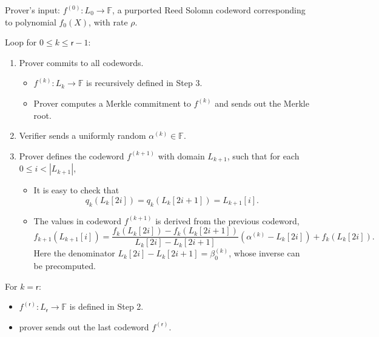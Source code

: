 Prover's input: 
$f^{(0)}: L_{0} \rightarrow \mathbb{F}$, a purported Reed Solomn codeword corresponding to polynomial $f_{0}(X)$,  with rate $\rho$.
\newline

Loop for $0\le k \le \mathsf{r} - 1$:
\begin{enumerate}
	\item Prover commits to all codewords.
	
	\begin{itemize}
		\item $f^{(k)}: L_{k} \rightarrow \mathbb{F}$ is recursively defined in Step 3.
		\item Prover computes a Merkle commitment to $f^{(k)}$ and sends out the Merkle root.
	\end{itemize}
	
	\item Verifier sends a uniformly random $\alpha^{(k)}\in \mathbb{F}.$
	\item Prover defines the codeword $f^{(k+1)}$ with domain $L_{k+1}$, such that for each $0\le i< |L_{k+1}|$, 
	\begin{itemize}
		\item It is easy to check that 
		\[q_k(L_{k}[2i]) = q_k(L_{k}[2i + 1]) = L_{k+1}[i].\]
		\item The values in codeword  $f^{(k+1)}$ is derived from the previous codeword,
		\begin{equation*}
			f_{k+1}(L_{k+1}[i]) =\frac{f_{k}(L_{k}[2i]) - f_{k}(L_{k}[2i+1])}{L_{k}[2i] - L_{k}[2i+1]} (\alpha^{(k)} - L_{k}[2i]) + f_{k}(L_{k}[2i]).
		\end{equation*}
		Here the denominator ${L_{k}[2i] - L_{k}[2i+1]} = \beta_0^{(k)} $, whose inverse can be precomputed.
	\end{itemize}
\end{enumerate}

For $k = \mathsf{r}$:

\begin{itemize}
	\item $f^{(\mathsf{r})}: L_{\mathsf{r}} \rightarrow \mathbb{F}$ is defined in Step 2.
	\item prover sends out the last codeword $f^{(\mathsf{r})}$.
\end{itemize}


